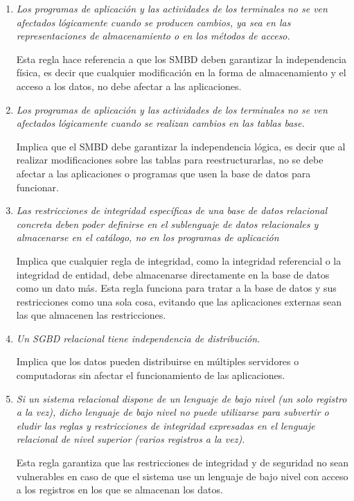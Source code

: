 \begin{enumerate}[start=0]
    Indica que el sistema debe ser capaz de operar con conjuntos de datos para consultar, insertar, modificar y eliminar datos. Esta propiedad permite que los SMBD sean capaces de manipular grandes cantidades de datos de forma eficiente.
    
    \item \textit{Los programas de aplicación y las actividades de los terminales no se ven afectados lógicamente cuando se producen cambios, ya sea en las representaciones de almacenamiento o en los métodos de acceso.} \cite{Codd1985}

    Esta regla hace referencia a que los SMBD deben garantizar la independencia física, es decir que cualquier modificación en la forma de almacenamiento y el acceso a los datos, no debe afectar a las aplicaciones.
    
    \item \textit{Los programas de aplicación y las actividades de los terminales no se ven afectados lógicamente cuando se realizan cambios en las tablas base.}\cite{Codd1985}
    
    Implica que el SMBD debe garantizar la independencia lógica, es decir que al realizar modificaciones sobre las tablas para reestructurarlas, no se debe afectar a las aplicaciones o programas que usen la base de datos para funcionar.
    
    \item \textit{Las restricciones de integridad específicas de una base de datos relacional concreta deben poder definirse en el sublenguaje de datos relacionales y almacenarse en el catálogo, no en los programas de aplicación}   \cite{Codd1985}
    
    Implica que cualquier regla de integridad, como la integridad referencial o la integridad de entidad, debe almacenarse directamente en la base de datos como un dato más. Esta regla funciona para tratar a la base de datos y sus restricciones como una sola cosa, evitando que las aplicaciones externas sean las que almacenen las restricciones.
    
    \item \textit{Un SGBD relacional tiene independencia de distribución.}\cite{Codd1985}
    
    Implica que los datos pueden distribuirse en múltiples servidores o computadoras sin afectar el funcionamiento de las aplicaciones.
    
    \item \textit{Si un sistema relacional dispone de un lenguaje de bajo nivel (un solo registro a la vez), dicho lenguaje de bajo nivel no puede utilizarse para subvertir o eludir las reglas y
restricciones de integridad expresadas en el lenguaje relacional de nivel superior (varios registros a la vez).}\cite{Codd1985}

    Esta regla garantiza que las restricciones de integridad y de seguridad no sean vulnerables en caso de que el sistema use un lenguaje de bajo nivel con acceso a los registros en los que se almacenan los datos.
    
\end{enumerate}

